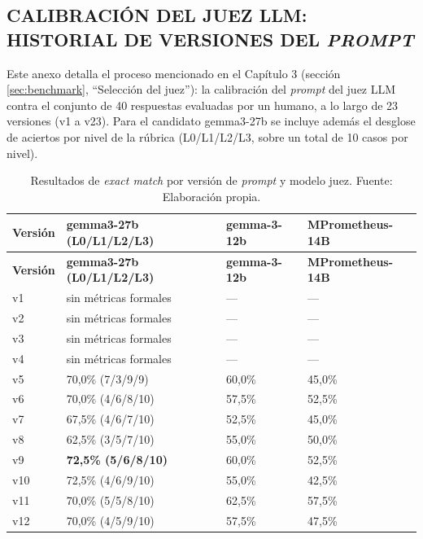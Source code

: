 \subsection{CALIBRACIÓN DEL JUEZ LLM: HISTORIAL DE VERSIONES DEL \textit{PROMPT}}
\label{anexo:promptsjuez}

Este anexo detalla el proceso mencionado en el Capítulo 3 (sección \ref{sec:benchmark}, ``Selección del juez''): la calibración del \textit{prompt} del juez LLM contra el conjunto de 40 respuestas evaluadas por un humano, a lo largo de 23 versiones (v1 a v23). Para el candidato gemma3-27b se incluye además el desglose de aciertos por nivel de la rúbrica (L0/L1/L2/L3, sobre un total de 10 casos por nivel).

\begin{longtable}{|p{1.5cm}|p{5cm}|p{2.8cm}|p{2.8cm}|}
    \caption{\label{table:historialprompts}Resultados de \textit{exact match} por versión de \textit{prompt} y modelo juez. Fuente: Elaboración propia.} \\
    \hline
    \textbf{Versión} & \textbf{gemma3-27b (L0/L1/L2/L3)} & \textbf{gemma-3-12b} & \textbf{MPrometheus-14B} \\
    \hline
    \endfirsthead
    \hline
    \textbf{Versión} & \textbf{gemma3-27b (L0/L1/L2/L3)} & \textbf{gemma-3-12b} & \textbf{MPrometheus-14B} \\
    \hline
    \endhead
    \hline
    \endfoot
    v1 & sin métricas formales & — & — \\
    \hline
    v2 & sin métricas formales & — & — \\
    \hline
    v3 & sin métricas formales & — & — \\
    \hline
    v4 & sin métricas formales & — & — \\
    \hline
    v5 & 70,0\% (7/3/9/9) & 60,0\% & 45,0\% \\
    \hline
    v6 & 70,0\% (4/6/8/10) & 57,5\% & 52,5\% \\
    \hline
    v7 & 67,5\% (4/6/7/10) & 52,5\% & 45,0\% \\
    \hline
    v8 & 62,5\% (3/5/7/10) & 55,0\% & 50,0\% \\
    \hline
    v9 & \textbf{72,5\% (5/6/8/10)} & 60,0\% & 52,5\% \\
    \hline
    v10 & 72,5\% (4/6/9/10) & 55,0\% & 42,5\% \\
    \hline
    v11 & 70,0\% (5/5/8/10) & 62,5\% & 57,5\% \\
    \hline
    v12 & 70,0\% (4/5/9/10) & 57,5\% & 47,5\% \\

\end{longtable}
